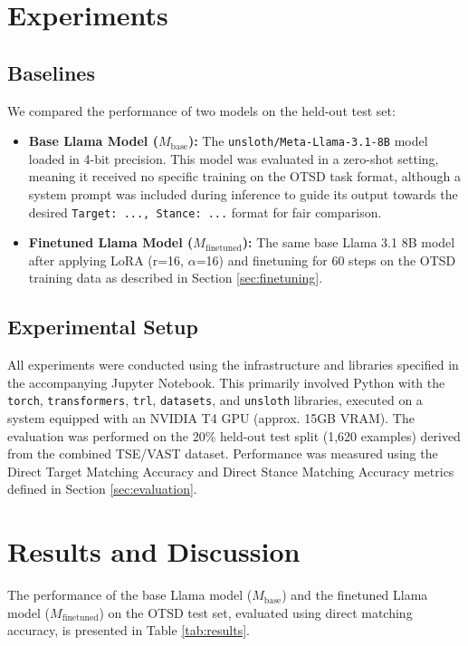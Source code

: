 \documentclass[twocolumn, 11pt,letterpaper]{article}
\begin{document}
\section{Experiments}
\label{sec:experiments}

\subsection{Baselines}
\label{sec:baselines}

We compared the performance of two models on the held-out test set:
\begin{itemize}
    \item \textbf{Base Llama Model ($M_{\text{base}}$):} The \texttt{unsloth/Meta-Llama-3.1-8B} model loaded in 4-bit precision. This model was evaluated in a zero-shot setting, meaning it received no specific training on the OTSD task format, although a system prompt was included during inference to guide its output towards the desired \texttt{Target: ..., Stance: ...} format for fair comparison.
    \item \textbf{Finetuned Llama Model ($M_{\text{finetuned}}$):} The same base Llama 3.1 8B model after applying LoRA (r=16, $\alpha$=16) and finetuning for 60 steps on the OTSD training data as described in Section \ref{sec:finetuning}.
\end{itemize}

\subsection{Experimental Setup}
\label{sec:setup}

All experiments were conducted using the infrastructure and libraries specified in the accompanying Jupyter Notebook. This primarily involved Python with the \texttt{torch}, \texttt{transformers}, \texttt{trl}, \texttt{datasets}, and \texttt{unsloth} libraries, executed on a system equipped with an NVIDIA T4 GPU (approx. 15GB VRAM). The evaluation was performed on the 20\% held-out test split (1,620 examples) derived from the combined TSE/VAST dataset. Performance was measured using the Direct Target Matching Accuracy and Direct Stance Matching Accuracy metrics defined in Section \ref{sec:evaluation}.

\section{Results and Discussion}
\label{sec:results}

The performance of the base Llama model ($M_{\text{base}}$) and the finetuned Llama model ($M_{\text{finetuned}}$) on the OTSD test set, evaluated using direct matching accuracy, is presented in Table \ref{tab:results}.
\end{document}
